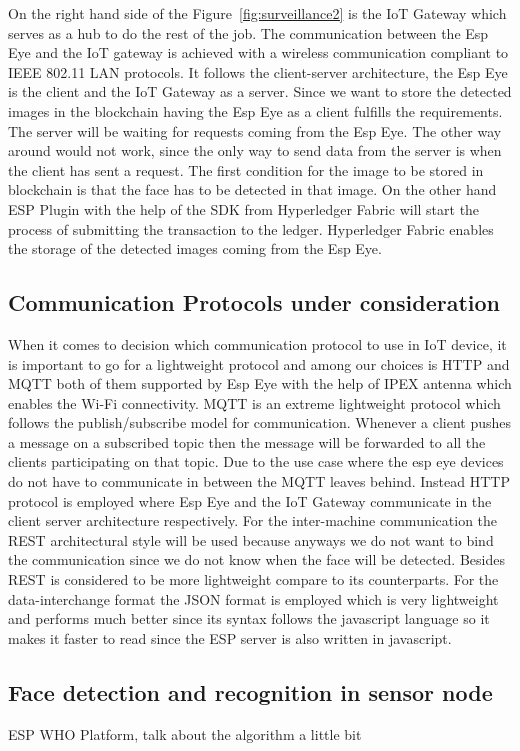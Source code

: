 On the right hand side of the Figure~\ref{fig:surveillance2} is the IoT Gateway which serves as a hub to do the rest of the job. The communication between the Esp Eye and the IoT gateway is achieved with a wireless communication compliant to IEEE 802.11 LAN protocols. It follows the client-server architecture, the Esp Eye is the client and the IoT Gateway as a server. Since we want to store the detected images in the blockchain having the Esp Eye as a client fulfills the requirements. The server will be waiting for requests coming from the Esp Eye. The other way around would not work, since the only way to send data from the server is when the client has sent a request. The first condition for the image to be stored in blockchain is that the face has to be detected in that image. On the other hand ESP Plugin with the help of the SDK from Hyperledger Fabric will start the process of submitting the transaction to the ledger. Hyperledger Fabric enables the storage of the detected images coming from the Esp Eye.   

\subsection{Communication Protocols under consideration}
When it comes to decision which communication protocol to use in IoT device, it is important to go for a lightweight protocol and among our choices is HTTP and MQTT both of them supported by Esp Eye with the help of IPEX antenna which enables the Wi-Fi connectivity. MQTT is an extreme lightweight protocol which follows the publish/subscribe model for communication. Whenever a client pushes a message on a subscribed topic then the message will be forwarded to all the clients participating on that topic. Due to the use case where the esp eye devices do not have to communicate in between the MQTT leaves behind. 
Instead HTTP protocol is employed where Esp Eye and the IoT Gateway communicate in the client server architecture respectively. For the inter-machine communication the REST architectural style will be used because anyways we do not want to bind the communication since we do not know when the face will be detected. Besides REST is considered to be more lightweight compare to its counterparts. For the data-interchange format the JSON format is employed which is very lightweight and performs much better since its syntax follows the javascript language so it makes it faster to read since the ESP server is also written in javascript.  
\subsection{Face detection and recognition in sensor node}
ESP WHO Platform, talk about the algorithm a little bit





